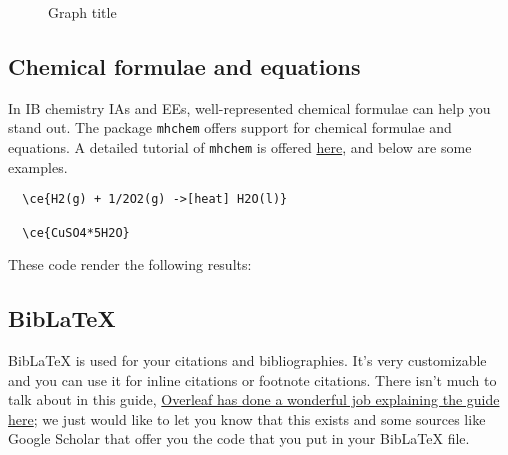 \begin{figure}[H]
\caption{Graph title}
\begin{center}
\end{center}
\end{figure}

\subsection{Chemical formulae and equations}
In IB chemistry IAs and EEs, well-represented chemical formulae can help you stand out. The package \texttt{mhchem} offers support for chemical formulae and equations. A detailed tutorial of \texttt{mhchem} is offered \href{http://mirrors.ctan.org/macros/latex/contrib/mhchem/mhchem.pdf}{here}, and below are some examples.

\begin{verbatim}
  \ce{H2(g) + 1/2O2(g) ->[heat] H2O(l)}

  \ce{CuSO4*5H2O}
\end{verbatim}

These code render the following results:



\subsection{BibLaTeX}
BibLaTeX is used for your citations and bibliographies.
It's very customizable and you can use it for inline citations or footnote citations.
There isn't much to talk about in this guide,
\href{https://www.overleaf.com/learn/latex/Articles/Getting_started_with_BibLaTeX}
{Overleaf has done a wonderful job explaining the guide here};
we just would like to let you know that this exists and some sources like Google Scholar
that offer you the code that you put in your BibLaTeX file.
